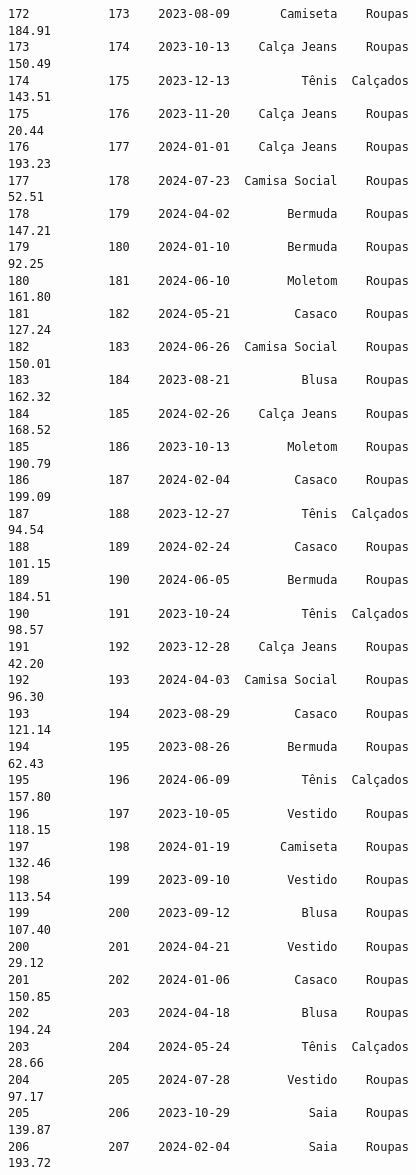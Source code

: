 \documentclass[11pt]{article}
\begin{document}
\begin{Verbatim}[commandchars=\\\{\}]
172           173    2023-08-09       Camiseta    Roupas          184.91   
173           174    2023-10-13    Calça Jeans    Roupas          150.49   
174           175    2023-12-13          Tênis  Calçados          143.51   
175           176    2023-11-20    Calça Jeans    Roupas           20.44   
176           177    2024-01-01    Calça Jeans    Roupas          193.23   
177           178    2024-07-23  Camisa Social    Roupas           52.51   
178           179    2024-04-02        Bermuda    Roupas          147.21   
179           180    2024-01-10        Bermuda    Roupas           92.25   
180           181    2024-06-10        Moletom    Roupas          161.80   
181           182    2024-05-21         Casaco    Roupas          127.24   
182           183    2024-06-26  Camisa Social    Roupas          150.01   
183           184    2023-08-21          Blusa    Roupas          162.32   
184           185    2024-02-26    Calça Jeans    Roupas          168.52   
185           186    2023-10-13        Moletom    Roupas          190.79   
186           187    2024-02-04         Casaco    Roupas          199.09   
187           188    2023-12-27          Tênis  Calçados           94.54   
188           189    2024-02-24         Casaco    Roupas          101.15   
189           190    2024-06-05        Bermuda    Roupas          184.51   
190           191    2023-10-24          Tênis  Calçados           98.57   
191           192    2023-12-28    Calça Jeans    Roupas           42.20   
192           193    2024-04-03  Camisa Social    Roupas           96.30   
193           194    2023-08-29         Casaco    Roupas          121.14   
194           195    2023-08-26        Bermuda    Roupas           62.43   
195           196    2024-06-09          Tênis  Calçados          157.80   
196           197    2023-10-05        Vestido    Roupas          118.15   
197           198    2024-01-19       Camiseta    Roupas          132.46   
198           199    2023-09-10        Vestido    Roupas          113.54   
199           200    2023-09-12          Blusa    Roupas          107.40   
200           201    2024-04-21        Vestido    Roupas           29.12   
201           202    2024-01-06         Casaco    Roupas          150.85   
202           203    2024-04-18          Blusa    Roupas          194.24   
203           204    2024-05-24          Tênis  Calçados           28.66   
204           205    2024-07-28        Vestido    Roupas           97.17   
205           206    2023-10-29           Saia    Roupas          139.87   
206           207    2024-02-04           Saia    Roupas          193.72   

\end{Verbatim}
\end{document}
